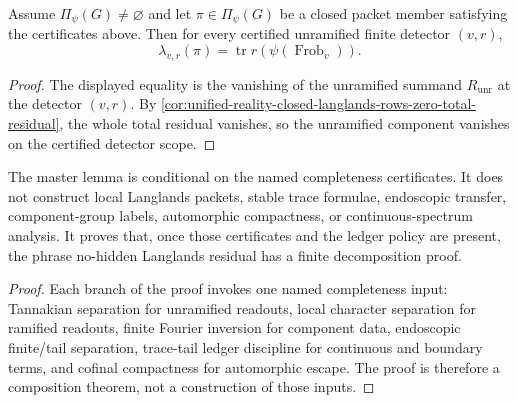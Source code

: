 \begin{corollary}
\label{cor:unified-reality-reciprocity-from-existence-and-no-hidden-residual}
Assume $\Pi_\psi(G)\ne\varnothing$ and let
$\pi\in\Pi_\psi(G)$ be a closed packet member satisfying the
certificates above. Then for every certified unramified finite detector
$(v,r)$,
$$
\lambda_{v,r}(\pi)
=
\operatorname{tr}r(\psi(\operatorname{Frob}_v)).
$$
\end{corollary}
\begin{proof}
The displayed equality is the vanishing of the unramified summand
$R_{\mathrm{unr}}$ at the detector $(v,r)$. By
\autoref{cor:unified-reality-closed-langlands-rows-zero-total-residual},
the whole total residual vanishes, so the unramified component vanishes
on the certified detector scope.
\end{proof}

\begin{theorem}
\label{thm:unified-reality-no-hidden-residual-master-lemma-boundary}
The master lemma is conditional on the named completeness certificates.
It does not construct local Langlands packets, stable trace formulae,
endoscopic transfer, component-group labels, automorphic compactness, or
continuous-spectrum analysis. It proves that, once those certificates
and the ledger policy are present, the phrase no-hidden Langlands
residual has a finite decomposition proof.
\end{theorem}
\begin{proof}
Each branch of the proof invokes one named completeness input:
Tannakian separation for unramified readouts, local character
separation for ramified readouts, finite Fourier inversion for
component data, endoscopic finite/tail separation, trace-tail ledger
discipline for continuous and boundary terms, and cofinal compactness
for automorphic escape. The proof is therefore a composition theorem,
not a construction of those inputs.
\end{proof}
